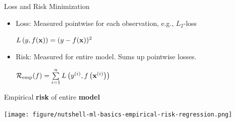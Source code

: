 \documentclass[11pt,compress,t,notes=noshow, xcolor=table]{beamer}
\begin{document}
\begin{vbframe}{Loss and Risk Minimization}

\begin{itemize}
\item Loss: Measured pointwise for each observation, e.g., $L_2$-loss
\begin{center}
$L\left(y, f(\mathbf{x})\right) = (y - f(\mathbf{x}))^2$
\end{center}
\item Risk: Measured for entire model. Sums up pointwise losses.
\begin{center}
$ \mathcal{R}_{\text{emp}}(f) = \sum\limits_{i=1}^n L\left(y^{(i)}, f\left(\mathbf{x}^{(i)}\right)\right) $
\end{center}
\hspace{1cm}
\end{itemize}

\vspace{1em}

{
\small Empirical \textbf{risk} of entire \textbf{model}

  \begin{center}
    \texttt{[image: figure/nutshell-ml-basics-empirical-risk-regression.png]}
  \end{center}
}
\end{vbframe}
\end{document}
